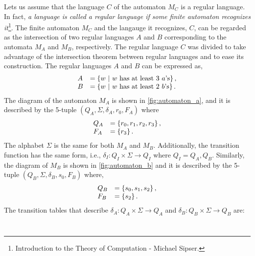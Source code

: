 \begin{solution}
    Lets us assume that the language $C$ of the automaton $M_C$ is a regular language. In fact, \textit{a language is called a regular language if some finite automaton recognizes it}\footnote{Introduction to the Theory of Computation - Michael Sipser.}. The finite automaton $M_C$ and the langauge it recognizes, $C$, can be regarded as the intersection of two regular languages $A$ and $B$ corresponding to the automata $M_A$ and $M_B$, respectively. The regular language $C$ was divided to take advantage of the intersection theorem between regular languages and to ease its construction. The regular languages $A$ and $B$ can be expressed as,
    \begin{equation*}
        \begin{array}{l l}
            A & = \left\{w\ |\ w\ \text{has at least 3 $a$'s}\right\}, \\
            B & = \left\{w\ |\ w\ \text{has at least 2 $b$'s}\right\}.
        \end{array}
    \end{equation*}
    The diagram of the automaton $M_A$ is shown in \cref{fig:automaton_a}, and it is described by the 5-tuple $(Q_A,\Sigma,\delta_A,r_0,F_A)$ where
    \begin{equation*}
        \begin{array}{l l}
            Q_A & = \left\{r_0, r_1, r_2, r_3\right\}, \\
            F_A & = \left\{r_3\right\}.
        \end{array}
    \end{equation*}
    The alphabet $\Sigma$ is the same for both $M_A$ and $M_B$. Additionally, the transition function has the same form, i.e., $\delta_I : Q_I \times \Sigma \to Q_I$ where $Q_I = Q_A, Q_B$. Similarly, the diagram of $M_B$ is shown in \cref{fig:automaton_b} and it is described by the 5-tuple $(Q_B, \Sigma, \delta_B, s_0, F_B)$ where,
    \begin{equation*}
        \begin{array}{l l}
            Q_B & = \left\{s_0, s_1, s_2\right\}, \\
            F_B & = \left\{s_2\right\}.
        \end{array}
    \end{equation*}
    The transition tables that describe $\delta_A : Q_A \times \Sigma \to Q_A$ and $\delta_B : Q_B \times \Sigma \to Q_B$ are:
    \begin{equation*}
        \begin{array}{c c}
            \begin{array}[t]{c | c c}

\end{array}
\end{array}
\end{equation*}
\end{solution}
